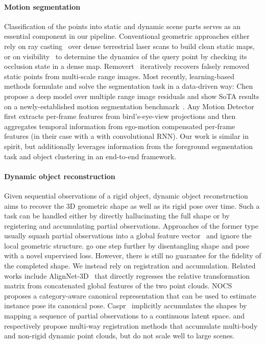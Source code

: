 \paragraph{Motion segmentation} 
Classification of the points into static and dynamic scene parts serves as an essential component in our pipeline.
Conventional geometric approaches either rely on ray casting~\cite{chen2016dynamic,schauer2018peopleremover} over dense terrestrial laser scans to build clean static maps, or on visibility~\cite{pomerleau2014long,kim2020remove} to determine the dynamics of the query point by checking its occlusion state in a dense map.
Removert~\cite{kim2020remove} iteratively recovers falsely removed static points from multi-scale range images. Most recently, learning-based methods formulate and solve the segmentation task in a data-driven way: Chen \etal~\cite{chen2021ral} propose a deep model over multiple range image residuals and show SoTA results on a newly-established motion segmentation benchmark~\cite{behley2019semantickitti}. Any Motion Detector~\cite{filatov2020any} first extracts per-frame features from bird's-eye-view projections and then aggregates temporal information from ego-motion compensated per-frame features (in their case with a with convolutional RNN). Our work is similar in spirit, but additionally leverages information from the foreground segmentation task and object clustering in an end-to-end framework.

\paragraph{Dynamic object reconstruction} 
Given sequential observations of a rigid object, dynamic object reconstruction aims to recover the 3D geometric shape as well as  its rigid pose over time. Such a task can be handled either by directly hallucinating the full shape or by registering and accumulating partial observations. Approaches of the former type usually squash partial observations into a global feature vector~\cite{yuan2018pcn,giancola2019leveraging,li2019pu} and ignore the local geometric structure. \cite{gu2020weakly} go one step further by disentangling shape and pose with a novel supervised loss. However, there is still no guarantee for the fidelity of the completed shape. We instead rely on registration and accumulation. Related works include AlignNet-3D~\cite{gross2019alignnet} that directly regresses the relative transformation matrix from concatenated global features of the two point clouds. NOCS~\cite{wang2019normalized} proposes a category-aware canonical representation that can be used to estimate instance pose \wrt its canonical pose. Caspr~\cite{rempe2020caspr} implicitly accumulates the shapes by mapping a sequence of partial observations to a continuous latent space. \cite{huang2021multibodysync} and \cite{huang2022multiway} respectively propose multi-way registration methods that accumulate multi-body and non-rigid dynamic point clouds, but do not scale well to large scenes.
